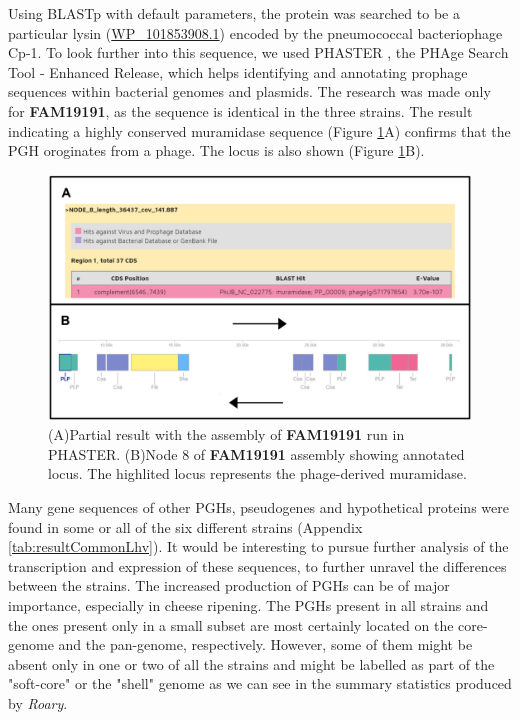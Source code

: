 \documentclass[10pt,a4paper]{article}
\begin{document}
\noindent Using BLASTp\cite{altschul_gapped_1997} with default parameters, the protein was searched to be a particular lysin (\href{https://www.ncbi.nlm.nih.gov/protein/1325986555}{WP\_101853908.1}) encoded by the pneumococcal bacteriophage Cp-1\cite{martin_pneumococcal_1998}. To look further into this sequence, we used PHASTER \cite{arndt_phaster:_2016}, the PHAge Search Tool - Enhanced Release, which helps identifying and annotating prophage sequences within bacterial genomes and plasmids. The research was made only for \textbf{FAM19191}, as the sequence is identical in the three strains. The result indicating a highly conserved muramidase sequence (Figure \ref{fig:phasterresultmuramidase}A) confirms that the PGH oroginates from a phage. The locus is also shown (Figure \ref{fig:phasterresultmuramidase}B). 

\begin{figure}[H]
	\centering
	\includegraphics[width=0.7\linewidth]{img/fasterfasterfucker}
	\caption{(A)Partial result with the assembly of \textbf{FAM19191} run in PHASTER. (B)Node 8 of \textbf{FAM19191} assembly showing annotated locus. The highlited locus represents the phage-derived muramidase.}
	\label{fig:phasterresultmuramidase}
\end{figure}





\noindent Many gene sequences of other PGHs, pseudogenes and hypothetical proteins were found in some or all of the six different strains (Appendix \ref{tab:resultCommonLhv}). It would be interesting to pursue further analysis of the transcription and expression of these sequences, to further unravel the differences between the strains. The increased production of PGHs can be of major importance, especially in cheese ripening. The PGHs present in all strains and the ones present only in a small subset are most certainly located on the core-genome and the pan-genome, respectively. However, some of them might be absent only in one or two of all the strains and might be labelled as part of the "soft-core" or the "shell" genome \cite{kaas_estimating_2012,inglin_clustering_2018} as we can see in the summary statistics produced by \textit{Roary}.
\end{document}
